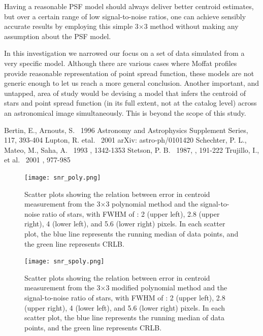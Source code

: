 \documentclass[12pt, preprint]{aastex}
\begin{document}
Having a reasonable PSF model should always deliver better centroid estimates, but over a certain range of low signal-to-noise ratios, one can achieve sensibly accurate results by employing this simple 3$\times$3 method without making any assumption about the PSF model.

In this investigation we narrowed our focus on a set of data simulated from a very specific model. Although there are various cases where Moffat profiles provide reasonable representation of point spread function, these models are not generic enough to let us reach a more general conclusion. Another important, and untapped, area of study would be devising a model that infers the centroid of stars and point spread function (in its full extent, not at the catalog level) across an astronomical image simultaneously. This is beyond the scope of this study. 




\begin{thebibliography}{70}

 Bertin, E., Arnouts, S. \ 1996  Astronomy and Astrophysics Supplement Series, 117, 393-404
 Lupton, R. etal. \ 2001  arXiv: astro-ph/0101420
 Schechter, P. L., Mateo, M., Saha, A. \ 1993 \pasp, 1342-1353
 Stetson, P. B. \ 1987, \pasp, 191-222
 Trujillo, I., et al. \ 2001 \mnras, 977-985

\end{thebibliography}

\clearpage


\begin{figure}[!htb]
  \texttt{[image: snr\_poly.png]}
\endminipage
\caption{Scatter plots showing the relation between error in centroid measurement from the 3$\times$3 polynomial method and the signal-to-noise ratio of stars, with FWHM of : 2 (upper left), 2.8 (upper right), 4 (lower left), and 5.6 (lower right) pixels. In each scatter plot, the blue line represents the running median of data points, and the green line represents CRLB.}\label{1}
\end{figure}

\begin{figure}[!htb]
  \texttt{[image: snr\_spoly.png]}
\endminipage
\caption{Scatter plots showing the relation between error in centroid measurement from the 3$\times$3 modified polynomial method and the signal-to-noise ratio of stars, with FWHM of : 2 (upper left), 2.8 (upper right), 4 (lower left), and 5.6 (lower right) pixels. In each scatter plot, the blue line represents the running median of data points, and the green line represents CRLB.}\label{2}
\end{figure}
\end{document}
